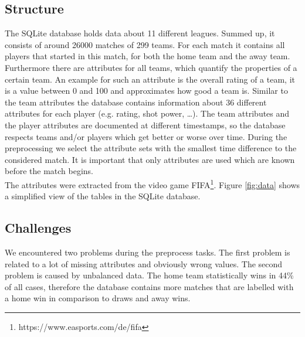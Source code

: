\documentclass[a4paper]{article}
\begin{document}
\subsection{Structure}
The SQLite database holds data about 11 different leagues. Summed up, it
consists of around 26000 matches of 299 teams. For each match it contains all
players that started in this match, for both the home team and the away team.
Furthermore there are attributes for all teams, which quantify the properties of
a certain team. An example for such an attribute is the overall rating of a
team, it is a value between 0 and 100 and approximates how good a team is.
Similar to the team attributes the database contains information about 36
different attributes for each player (e.g.
rating, shot power, \ldots). The team attributes and the player attributes are
documented at different timestamps, so the database respects teams and/or
players which get better or worse over time. During the preprocessing we select
the attribute sets with the smallest time difference to the considered match. It
is important that only attributes are used which are known before the match
begins.
\\
The attributes were extracted from the video game
FIFA\footnote{https://www.easports.com/de/fifa}.
Figure \ref{fig:data} shows a simplified view of the tables in the SQLite
database.

\subsection{Challenges}
We encountered two problems during the preprocess tasks. The first problem is
related to a lot of missing attributes and obviously wrong values. The second
problem is caused by unbalanced data. The home team statistically wins in 44\%
of all cases, therefore the database contains more matches that are labelled
with a home win in comparison to draws and away wins.
\end{document}
